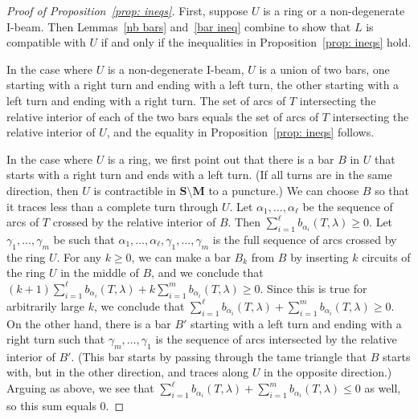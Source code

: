 \documentclass{amsart}
\theoremstyle{definition}
\theoremstyle{remark}
\numberwithin{equation}{section}
\newcommand{\0}{{\mathbf{0}}}
\newcommand{\M}{\mathbf{M}}
\renewcommand{\S}{\mathbf{S}}
\begin{document}
\begin{proof}[Proof of Proposition~\ref{prop: ineqs}]
First, suppose $U$ is a ring or a non-degenerate I-beam.
Then Lemmas~\ref{nb bars} and~\ref{bar ineq} combine to show that $L$ is compatible with $U$ if and only if the inequalities in Proposition~\ref{prop: ineqs} hold.

In the case where $U$ is a non-degenerate I-beam, $U$ is a union of two bars, one starting with a right turn and ending with a left turn, the other starting with a left turn and ending with a right turn.
The set of arcs of $T$ intersecting the relative interior of each of the two bars equals the set of arcs of $T$ intersecting the relative interior of $U$, and the equality in Proposition~\ref{prop: ineqs} follows.

In the case where $U$ is a ring, we first point out that there is a bar $B$ in $U$ that starts with a right turn and ends with a left turn.
(If all turns are in the same direction, then $U$ is contractible in $\S\setminus\M$ to a puncture.)
We can choose $B$ so that it traces less than a complete turn through $U$.
Let $\alpha_1,\ldots,\alpha_\ell$ be the sequence of arcs of $T$ crossed by the relative interior of $B$.
Then $\sum_{i=1}^\ell b_{\alpha_i}(T,\lambda)\geq 0$.
Let $\gamma_1,\ldots,\gamma_m$ be such that $\alpha_1,\ldots,\alpha_\ell,\gamma_1,\ldots,\gamma_m$ is the full sequence of arcs crossed by the ring $U$.
For any $k\ge0$, we can make a bar $B_k$ from $B$ by inserting $k$ circuits of the ring $U$ in the middle of $B$, and we conclude that $(k+1)\sum_{i=1}^\ell b_{\alpha_i}(T,\lambda)+k\sum_{i=1}^m b_{\alpha_i}(T,\lambda)\geq 0$.
Since this is true for arbitrarily large $k$, we conclude that $\sum_{i=1}^\ell b_{\alpha_i}(T,\lambda)+\sum_{i=1}^m b_{\alpha_i}(T,\lambda)\geq 0$.
On the other hand, there is a bar $B'$ starting with a left turn and ending with a right turn such that $\gamma_m,\ldots,\gamma_1$ is the sequence of arcs intersected by the relative interior of $B'$.
(This bar starts by passing through the tame triangle that $B$ starts with, but in the other direction, and traces along $U$ in the opposite direction.)
Arguing as above, we see that $\sum_{i=1}^\ell b_{\alpha_i}(T,\lambda)+\sum_{i=1}^m b_{\alpha_i}(T,\lambda)\leq 0$ as well, so this sum equals $0$.


\end{proof}
\end{document}
